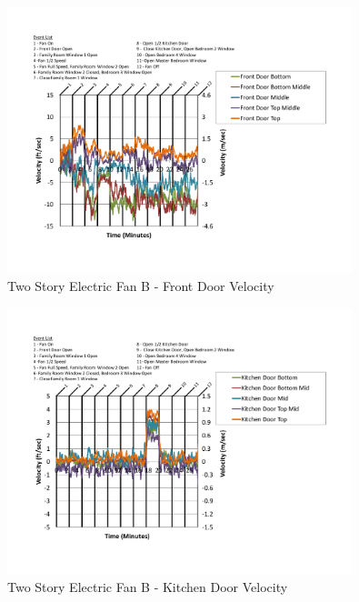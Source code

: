 \documentclass{article}
\begin{document}
\begin{appendices}
	\begin{figure}[H]
		\centering
		\includegraphics[height=3.05in,trim=0.67in 1.1in 0.67in 0.8in,clip=true]{0_Images/Results_Charts/ColdFlow/Two_Story/Electric/B/Front_Door_Velocity.pdf}
		\caption{Two Story Electric Fan B - Front Door Velocity}
	\end{figure}
 

	\begin{figure}[H]
		\centering
		\includegraphics[height=3.05in,trim=0.67in 1.1in 0.67in 0.8in,clip=true]{0_Images/Results_Charts/ColdFlow/Two_Story/Electric/B/Kitchen_Door_Velocity.pdf}
		\caption{Two Story Electric Fan B - Kitchen Door Velocity}
	\end{figure}
 
	\clearpage


\end{appendices}
\end{document}
